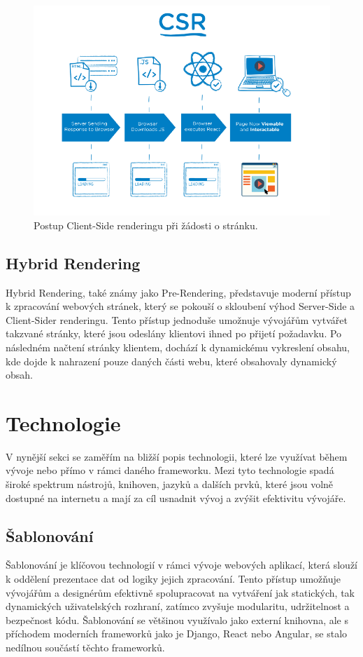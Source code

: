 \begin{figure}[H]
    \centering
    \includegraphics[width=1.0\textwidth]{figures/client-side-rendering}
    \caption{Postup Client-Side renderingu při žádosti o stránku. \cite{rendering-diff}}
    \label{fig:client-side-rendering}
\end{figure}

\subsection{Hybrid Rendering}
\label{subsec:dev-request-processing-hybrid-rendering}
Hybrid Rendering, také známy jako Pre-Rendering, představuje moderní přístup k zpracování webových stránek, který se pokouší o skloubení výhod Server-Side a Client-Sider renderingu. Tento přístup jednoduše umožnuje vývojářům vytvářet takzvané  stránky, které jsou odeslány klientovi ihned po přijetí požadavku. Po následném načtení stránky klientem, dochází k dynamickému vykreslení obsahu, kde dojde k nahrazení pouze daných části webu, které obsahovaly dynamický obsah.

\section{Technologie}
\label{sec:dev-technology}
V nynější sekci se zaměřím na bližší popis technologii, které lze využívat během vývoje nebo přímo v rámci daného frameworku. Mezi tyto technologie spadá široké spektrum nástrojů, knihoven, jazyků a dalších prvků, které jsou volně dostupné na internetu a mají za cíl usnadnit vývoj a zvýšit efektivitu vývojáře.

\subsection{Šablonování}
\label{subsec:dev-technology-templating}
Šablonování je klíčovou technologií v rámci vývoje webových aplikací, která slouží k oddělení prezentace dat od logiky jejich zpracování. Tento přístup umožňuje vývojářům a designérům efektivně spolupracovat na vytváření jak statických, tak dynamických uživatelských rozhraní, zatímco zvyšuje modularitu, udržitelnost a bezpečnost kódu. Šablonování se většinou využívalo jako externí knihovna, ale s příchodem moderních frameworků jako je Django, React nebo Angular, se stalo nedílnou součástí těchto frameworků.

